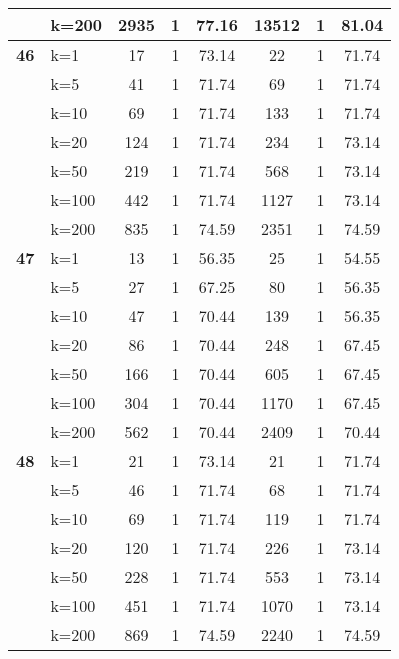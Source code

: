\begin{table}[htbp]
\begin{tabular}{ll|ccc|ccc}
     & k=200 & 2935 & 1 & 77.16 & 13512 & 1 & 81.04 \\ \hline
    \multicolumn{1}{r}{\textbf{46}} & k=1 & 17 & 1 & 73.14 & 22 & 1 & 71.74 \\ 
     & k=5 & 41 & 1 & 71.74 & 69 & 1 & 71.74 \\ 
     & k=10 & 69 & 1 & 71.74 & 133 & 1 & 71.74 \\ 
     & k=20 & 124 & 1 & 71.74 & 234 & 1 & 73.14 \\ 
     & k=50 & 219 & 1 & 71.74 & 568 & 1 & 73.14 \\ 
     & k=100 & 442 & 1 & 71.74 & 1127 & 1 & 73.14 \\ 
     & k=200 & 835 & 1 & 74.59 & 2351 & 1 & 74.59 \\ \hline
    \multicolumn{1}{r}{\textbf{47}} & k=1 & 13 & 1 & 56.35 & 25 & 1 & 54.55 \\ 
     & k=5 & 27 & 1 & 67.25 & 80 & 1 & 56.35 \\ 
     & k=10 & 47 & 1 & 70.44 & 139 & 1 & 56.35 \\ 
     & k=20 & 86 & 1 & 70.44 & 248 & 1 & 67.45 \\ 
     & k=50 & 166 & 1 & 70.44 & 605 & 1 & 67.45 \\ 
     & k=100 & 304 & 1 & 70.44 & 1170 & 1 & 67.45 \\ 
     & k=200 & 562 & 1 & 70.44 & 2409 & 1 & 70.44 \\ \hline
    \multicolumn{1}{r}{\textbf{48}} & k=1 & 21 & 1 & 73.14 & 21 & 1 & 71.74 \\ 
     & k=5 & 46 & 1 & 71.74 & 68 & 1 & 71.74 \\ 
     & k=10 & 69 & 1 & 71.74 & 119 & 1 & 71.74 \\ 
     & k=20 & 120 & 1 & 71.74 & 226 & 1 & 73.14 \\ 
     & k=50 & 228 & 1 & 71.74 & 553 & 1 & 73.14 \\ 
     & k=100 & 451 & 1 & 71.74 & 1070 & 1 & 73.14 \\ 
     & k=200 & 869 & 1 & 74.59 & 2240 & 1 & 74.59 \\ \hline
    \end{tabular}
    \label{use_case_8}
    \end{table}
    